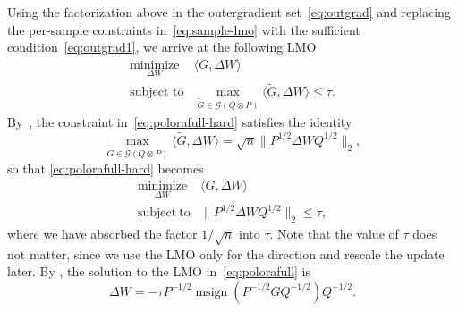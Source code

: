 \documentclass[11pt]{article}
\newcommand{\ip}[1]{\langle #1 \rangle}
\DeclareMathOperator{\msign}{msign}          %
\theoremstyle{plain}
\theoremstyle{definition}
\theoremstyle{remark}
\theoremstyle{definition}
\begin{document}
Using the factorization above in the outergradient set~\eqref{eq:outgrad} and replacing the per-sample constraints in~\eqref{eq:sample-lmo} with the sufficient condition~\eqref{eq:outgrad1}, we arrive at the following LMO
\begin{equation}
 \begin{array}{ll}
  \underset{\Delta W}{\mathrm{minimize}} &
  \ip{G, \Delta W} \\[2pt]
\mbox{subject to} &
  \displaystyle  
\max_{\widetilde{G} \in \mathcal{G}(Q \otimes P)} \ip{\widetilde{G}, \Delta W} 
  \le \tau.
  \end{array}
  \label{eq:polorafull-hard} 
\end{equation}
By~, the constraint in~\eqref{eq:polorafull-hard} satisfies the identity
\[
\max_{\widetilde{G} \in \mathcal{G}(Q \otimes P)}\ip{\widetilde{G}, \Delta W}
= \sqrt{n} \| P^{1/2} \Delta W Q^{1/2}\|_2,
\]
so that \eqref{eq:polorafull-hard} becomes
\begin{equation}
\begin{array}{ll}
\underset{\Delta W}{\mathrm{minimize}} &
\ip{G, \Delta W} \\[2pt]
\mathrm{subject~ to} &
\displaystyle  
\|P^{1/2} \Delta W Q^{1/2}\|_2 \leq  \tau,
\end{array}
\label{eq:polorafull}
\end{equation}
where we have absorbed the factor $1 / \sqrt{n}$ into $\tau$. Note that the value of $\tau$ does not matter, since we use the LMO only for the direction and rescale the update later. By , the solution to the LMO in~\eqref{eq:polorafull} is
\begin{equation}\label{eq:polorafull-update}
    \Delta W =  - \tau P^{-1/2} \msign(P^{-1/2} G Q^{-1/2}) Q^{-1/2}.
\end{equation}
\end{document}

